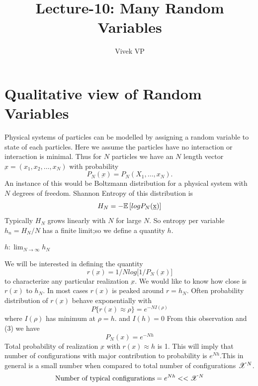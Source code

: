 \documentclass[letterpaper,english,12pt]{article}
\title{Lecture-10: Many Random Variables}
\author{Vivek VP}
\begin{document}
\maketitle
\section{Qualitative view of Random Variables}
Physical systems of particles can be modelled by assigning a random variable to state of each particles. Here we assume the particles have no interaction or interaction is minimal. Thus for $N$ particles we have an $N$ length vector $\underbar x = (x_1,x_2,\dots ,x_N)$ with probability 
\begin{equation}
  P_N(\underbar x) = P_N(X_1,\dots ,x_N) .
\end{equation}
An instance of this would be Boltzmann distribution for a physical system with $N$ degrees of freedom. Shannon Entropy of this distribution is 
  \begin{equation}
      H_N = -\mathbb{E}\left[log P_N(\underbar x) \right]
  \end{equation}
  Typically $H_N$ grows linearly with $N$ for large $N$. So entropy per variable $h_n=H_N/N$ has a finite limit;so we define a quantity $h$.
  
 \begin{defn}
 	$h: \lim_{N\to\infty} h_N$
 \end{defn}
  We will be interested in defining the quantity 
  \begin{equation}
      r(\underbar x) = 1/N log \big[ 1/P_N(\underbar x)\big]
  \end{equation}
  to characterize any particular realization $\underbar{x}$. We would like to know how close is $r(x)$ to $h_N$. In most cases $r(x)$ is peaked around $r=h_N$. Often probability distribution of $r(\underbar x)$ behave exponentially with 
  \begin{equation}
   P\lbrace r(x) \approx \rho \rbrace=e^{-NI(\rho)}
   \end{equation}
   where
   $I(\rho)$ has minimum at $\rho = h$.
   and $I(h)=0$
   From this observation and (3) we have 
   \begin{equation}
       P_N(x) = e^{-Nh}
   \end{equation}
   Total probability of realization $\underbar x$ with $r(x) \approx h$ is 1. This will imply that number of configurations with major contribution to probability is $e^{Nh}. $This in general is a  small number when compared to total number of configurations $\mathscr{X}^N$. 
   \begin{equation}
   	\text{Number of typical configurations}=e^{Nh}<<\mathscr{X}^N
   \end{equation}
\end{document}
